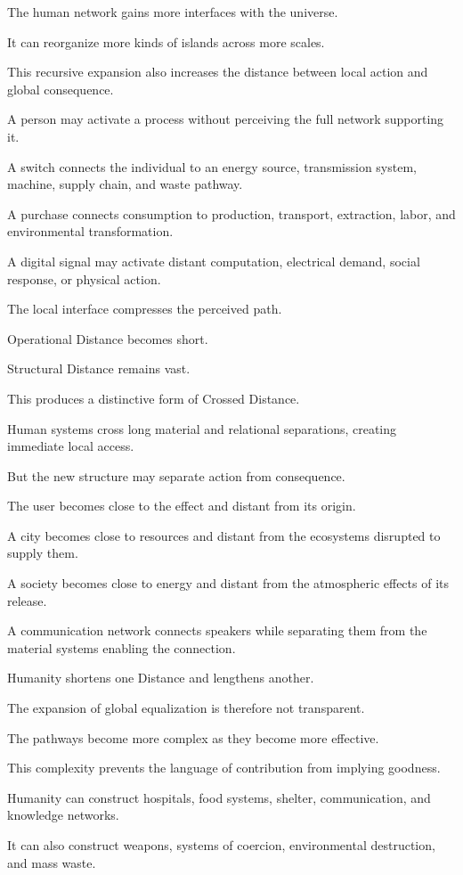 The human network gains more interfaces with the universe.

It can reorganize more kinds of islands across more scales.

This recursive expansion also increases the distance between local action and global consequence.

A person may activate a process without perceiving the full network supporting it.

A switch connects the individual to an energy source, transmission system, machine, supply chain, and waste pathway.

A purchase connects consumption to production, transport, extraction, labor, and environmental transformation.

A digital signal may activate distant computation, electrical demand, social response, or physical action.

The local interface compresses the perceived path.

Operational Distance becomes short.

Structural Distance remains vast.

This produces a distinctive form of Crossed Distance.

Human systems cross long material and relational separations, creating immediate local access.

But the new structure may separate action from consequence.

The user becomes close to the effect and distant from its origin.

A city becomes close to resources and distant from the ecosystems disrupted to supply them.

A society becomes close to energy and distant from the atmospheric effects of its release.

A communication network connects speakers while separating them from the material systems enabling the connection.

Humanity shortens one Distance and lengthens another.

The expansion of global equalization is therefore not transparent.

The pathways become more complex as they become more effective.

This complexity prevents the language of contribution from implying goodness.

Humanity can construct hospitals, food systems, shelter, communication, and knowledge networks.

It can also construct weapons, systems of coercion, environmental destruction, and mass waste.

